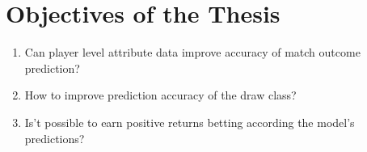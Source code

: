 \section{Objectives of the Thesis}
\begin{enumerate}
    \item Can player level attribute data improve accuracy of match outcome prediction?
    \item How to improve prediction accuracy of the draw class?
    \item Is't possible to earn positive returns betting according the model's predictions?
\end{enumerate}